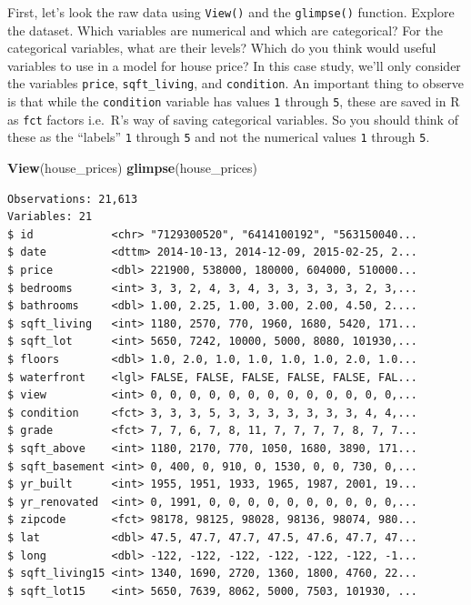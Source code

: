 \documentclass[12pt, krantz2,]{krantz}
\makeatletter
\newenvironment{Shaded}{\begin{snugshade}}{\end{snugshade}}
\newcommand{\KeywordTok}[1]{\textcolor[rgb]{0.27,0.27,0.27}{\textbf{#1}}}
\newcommand{\NormalTok}[1]{#1}
\newenvironment{kframe}{%
\medskip{}
\setlength{\fboxsep}{.8em}
 \def\at@end@of@kframe{}%
 \ifinner\ifhmode%
  \def\at@end@of@kframe{\end{minipage}}%
  \begin{minipage}{\columnwidth}%
 \fi\fi%
 \def\FrameCommand##1{\hskip\@totalleftmargin \hskip-\fboxsep
 \colorbox{shadecolor}{##1}\hskip-\fboxsep
     \hskip-\linewidth \hskip-\@totalleftmargin \hskip\columnwidth}%
 \MakeFramed {\advance\hsize-\width
   \@totalleftmargin\z@ \linewidth\hsize
   \@setminipage}}%
 {\par\unskip\endMakeFramed%
 \at@end@of@kframe}
\renewenvironment{Shaded}{\begin{kframe}}{\end{kframe}}
\makeatother
\begin{document}
First, let's look the raw data using \texttt{View()} and the \texttt{glimpse()} function. Explore the dataset. Which variables are numerical and which are categorical? For the categorical variables, what are their levels? Which do you think would useful variables to use in a model for house price? In this case study, we'll only consider the variables \texttt{price}, \texttt{sqft\_living}, and \texttt{condition}. An important thing to observe is that while the \texttt{condition} variable has values \texttt{1} through \texttt{5}, these are saved in R as \texttt{fct} factors i.e.~R's way of saving categorical variables. So you should think of these as the ``labels'' \texttt{1} through \texttt{5} and not the numerical values \texttt{1} through \texttt{5}.

\begin{Shaded}
\begin{Highlighting}[]
\KeywordTok{View}\NormalTok{(house_prices)}
\KeywordTok{glimpse}\NormalTok{(house_prices)}
\end{Highlighting}
\end{Shaded}

\begin{verbatim}
Observations: 21,613
Variables: 21
$ id            <chr> "7129300520", "6414100192", "563150040...
$ date          <dttm> 2014-10-13, 2014-12-09, 2015-02-25, 2...
$ price         <dbl> 221900, 538000, 180000, 604000, 510000...
$ bedrooms      <int> 3, 3, 2, 4, 3, 4, 3, 3, 3, 3, 3, 2, 3,...
$ bathrooms     <dbl> 1.00, 2.25, 1.00, 3.00, 2.00, 4.50, 2....
$ sqft_living   <int> 1180, 2570, 770, 1960, 1680, 5420, 171...
$ sqft_lot      <int> 5650, 7242, 10000, 5000, 8080, 101930,...
$ floors        <dbl> 1.0, 2.0, 1.0, 1.0, 1.0, 1.0, 2.0, 1.0...
$ waterfront    <lgl> FALSE, FALSE, FALSE, FALSE, FALSE, FAL...
$ view          <int> 0, 0, 0, 0, 0, 0, 0, 0, 0, 0, 0, 0, 0,...
$ condition     <fct> 3, 3, 3, 5, 3, 3, 3, 3, 3, 3, 3, 4, 4,...
$ grade         <fct> 7, 7, 6, 7, 8, 11, 7, 7, 7, 7, 8, 7, 7...
$ sqft_above    <int> 1180, 2170, 770, 1050, 1680, 3890, 171...
$ sqft_basement <int> 0, 400, 0, 910, 0, 1530, 0, 0, 730, 0,...
$ yr_built      <int> 1955, 1951, 1933, 1965, 1987, 2001, 19...
$ yr_renovated  <int> 0, 1991, 0, 0, 0, 0, 0, 0, 0, 0, 0, 0,...
$ zipcode       <fct> 98178, 98125, 98028, 98136, 98074, 980...
$ lat           <dbl> 47.5, 47.7, 47.7, 47.5, 47.6, 47.7, 47...
$ long          <dbl> -122, -122, -122, -122, -122, -122, -1...
$ sqft_living15 <int> 1340, 1690, 2720, 1360, 1800, 4760, 22...
$ sqft_lot15    <int> 5650, 7639, 8062, 5000, 7503, 101930, ...
\end{verbatim}
\end{document}
